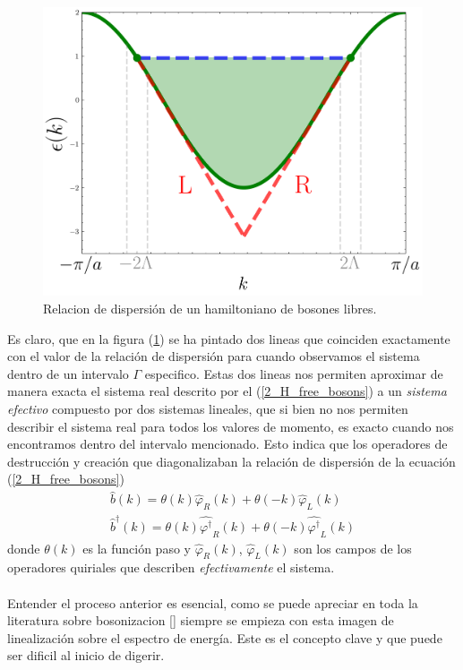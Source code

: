 \begin{figure}[h!]
    \centering
    \includegraphics[scale=0.5]{Figures/Chapter 2/Grafica_Bosonization_Relation.png}
    \caption{Relacion de dispersión de un hamiltoniano de bosones libres.}
    \label{2_fig_bosonic_chirial}
\end{figure}
Es claro, que en la figura (\ref{2_fig_bosonic_chirial}) se ha pintado dos lineas que coinciden exactamente con el valor de la relación de dispersión para cuando observamos el sistema dentro de un intervalo $\Gamma$ especifico. Estas dos lineas nos permiten aproximar de manera exacta el sistema real descrito por el (\ref{2_H_free_bosons}) a un \textit{sistema efectivo} compuesto por dos sistemas lineales, que si bien no nos permiten describir el sistema real para todos los valores de momento, es exacto cuando nos encontramos dentro del intervalo mencionado. Esto indica que los operadores de destrucción y creación que diagonalizaban la relación de dispersión de la ecuación (\ref{2_H_free_bosons}) 
\begin{equation} \label{eq_a_momentum_operator}
\begin{aligned}
     \hat{b}(k)=\theta(k) \hat{\varphi}_{R}(k)+\theta(-k) \hat{\varphi}_{L}(k) \\
     \hat{b}^{\dagger}(k)=\theta(k) \hat{\varphi^{\dagger}}_{R}(k)+\theta(-k) \hat{\varphi^{\dagger}}_{L}(k)     
\end{aligned}   
\end{equation}
donde $\theta(k)$ es la función paso y $\hat{\varphi}_{R}(k)$, $\hat{\varphi}_{L}(k)$ son los campos de los operadores quiriales que describen \textit{efectivamente} el sistema. \\ \\
Entender el proceso anterior es esencial, como se puede apreciar en toda la literatura sobre bosonizacion [] siempre se empieza con esta imagen de linealización sobre el espectro de energía. Este es el concepto clave y que puede ser dificil al inicio de digerir.


